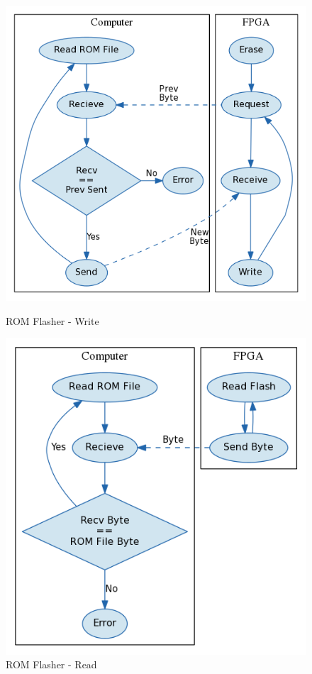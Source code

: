 \documentclass{article}
\begin{document}
\begin{figure}[H]
    \centering
    \begin{minipage}[H]{0.45\linewidth}
        \centering
        \includegraphics[width=\textwidth]{../../fpga/rom_flasher/doc/block_diagram_write.png}
        \caption{ROM Flasher - Write}
        \label{fig:rom_write}
    \end{minipage}
    \hspace{0.5cm}
    \begin{minipage}[H]{0.45\linewidth}
        \centering
        \includegraphics[width=\textwidth]{../../fpga/rom_flasher/doc/block_diagram_read.png}
        \caption{ROM Flasher - Read}
        \label{fig:rom_read}
    \end{minipage}
\end{figure}
\end{document}
